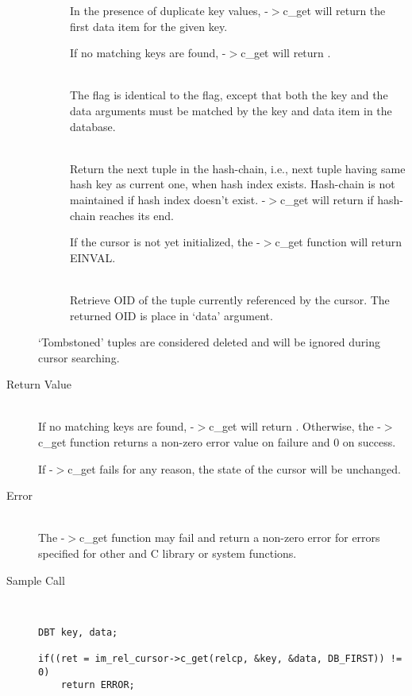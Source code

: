 \begin{description}
\begin{description}
    In the presence of duplicate key values, {\IMRELcursor}-$>$c\_get
    will return the first data item for the given key. 

    If no matching keys are found, {\IMRELcursor}-$>$c\_get will return
    {\DBNOTFOUND}.
  \item[{\DBGETBOTH}]\ \\
    The {\DBGETBOTH} flag is identical to the {\DBSET} flag, except
    that both the key and the data arguments must be matched by the
    key and data item in the database.
  \item[{\DBNEXTDUP}]\ \\
    Return the next tuple in the hash-chain, i.e., next tuple having
    same hash key as current one, when hash index exists.  Hash-chain
    is not maintained if hash index doesn't exist.
    {\IMRELcursor}-$>$c\_get will return {\DBNOTFOUND} if hash-chain
    reaches its end.

    If the cursor is not yet initialized, the {\IMRELcursor}-$>$c\_get
    function will return EINVAL.

  \item[{\DBGETOIDOFKEY}]\ \\
    Retrieve OID of the tuple currently referenced by the cursor.  The
    returned OID is place in `data' argument.
  \end{description}

  `Tombstoned' tuples are considered deleted and will be ignored
  during cursor searching.
\item[Return Value]\ \\
   If no matching keys are found, {\IMRELcursor}-$>$c\_get will return
   {\DBNOTFOUND}.  Otherwise, the {\IMRELcursor}-$>$c\_get function
   returns a non-zero error value on failure and 0 on success.

   If {\IMRELcursor}-$>$c\_get fails for any reason, the state of the
   cursor will be unchanged.

\item[Error]\ \\ 
The {\IMRELcursor}-$>$c\_get function may fail and return a non-zero
error for errors specified for other {\IMDB} and C library or system
functions.

\item[Sample Call]\ 
\begin{verbatim}
DBT key, data;

if((ret = im_rel_cursor->c_get(relcp, &key, &data, DB_FIRST)) != 0)
    return ERROR;
\end{verbatim}
\end{description}

